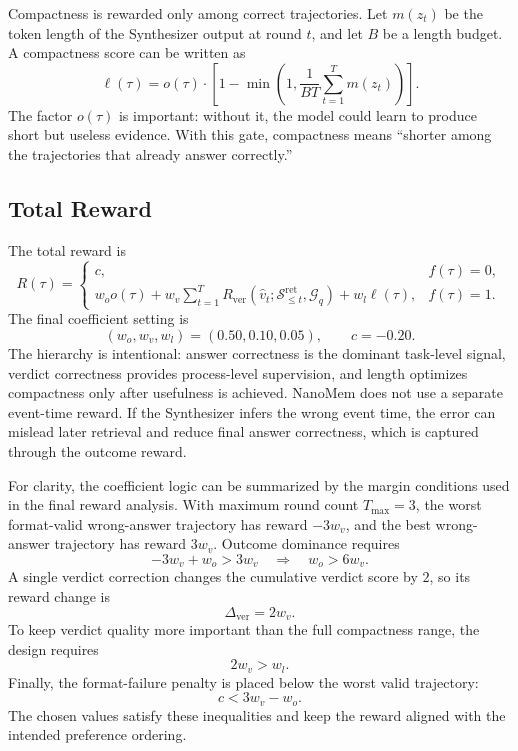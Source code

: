 Compactness is rewarded only among correct trajectories. Let $m(z_t)$ be the
token length of the Synthesizer output at round $t$, and let $B$ be a length
budget. A compactness score can be written as
\[
  \ell(\tau)
  =
  o(\tau)\cdot
  \left[
  1-\min\left(
      1,\frac{1}{BT}\sum_{t=1}^{T}m(z_t)
    \right)
  \right].
  \label{eq:length-reward}
\]
The factor $o(\tau)$ is important: without it, the model could learn to produce
short but useless evidence. With this gate, compactness means ``shorter among
the trajectories that already answer correctly.''

\subsection{Total Reward}
\label{subsec:methods-total-reward}

The total reward is
\[
R(\tau)
=
\begin{cases}
c, & f(\tau)=0,\\
w_o o(\tau)
+w_v\displaystyle\sum_{t=1}^{T}
R_{\mathrm{ver}}(\hat{v}_t;\mathcal{S}^{\mathrm{ret}}_{\le t},\mathcal{G}_q)
+w_l\ell(\tau), & f(\tau)=1.
\end{cases}
\label{eq:total-reward}
\]
The final coefficient setting is
\[
  (w_o,w_v,w_l)=(0.50,0.10,0.05),
  \qquad c=-0.20.
  \label{eq:reward-weights}
\]
The hierarchy is intentional: answer correctness is the dominant task-level
signal, verdict correctness provides process-level supervision, and length
optimizes compactness only after usefulness is achieved. NanoMem does not use a
separate event-time reward. If the Synthesizer infers the wrong event time, the
error can mislead later retrieval and reduce final answer correctness, which is
captured through the outcome reward.

For clarity, the coefficient logic can be summarized by the margin conditions
used in the final reward analysis. With maximum round count $T_{\max}=3$, the
worst format-valid wrong-answer trajectory has reward $-3w_v$, and the best
wrong-answer trajectory has reward $3w_v$. Outcome dominance requires
\[
  -3w_v+w_o>3w_v
  \quad\Longrightarrow\quad
  w_o>6w_v.
\]
A single verdict correction changes the cumulative verdict score by $2$, so
its reward change is
\[
  \Delta_{\mathrm{ver}}=2w_v.
\]
To keep verdict quality more important than the full compactness range, the
design requires
\[
  2w_v>w_l.
\]
Finally, the format-failure penalty is placed below the worst valid trajectory:
\[
  c<3w_v-w_o.
\]
The chosen values satisfy these inequalities and keep the reward aligned with
the intended preference ordering.

